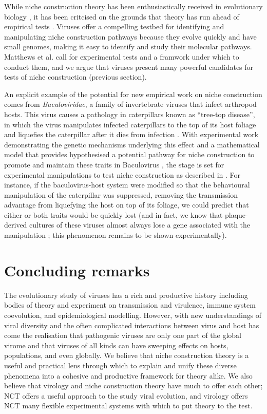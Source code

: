 \documentclass[review,draft,12pt]{elsarticle}
\begin{document}
While niche construction theory has been enthusiastically received in
evolutionary biology \citep{Laland:2010gb, Odling-Smee:2013zr}, it has
been critcised on the grounds that theory has run ahead of empirical
tests \citep{Scott-Phillips2014}. Viruses offer a compelling testbed for
identifying and manipulating niche construction pathways because they
evolve quickly and have small genomes, making it easy to identify and
study their molecular pathways. Matthews et al. \citep{Matthews2014}
call for experimental tests and a framwork under which to conduct them,
and we argue that viruses present many powerful candidates for tests of
niche construction (previous section).

An explicit example of the potential for new empirical work on niche
construction comes from \emph{Baculoviridae}, a family of invertebrate
viruses that infect arthropod hosts. This virus causes a pathology in
caterpillars known as ``tree-top disease'', in which the virus
manipulates infected caterpillars to the top of its host foliage and
liquefies the caterpillar after it dies from infection
\citep{Hoover:2011ly}. With experimental work demonstrating the genetic
mechanisms underlying this effect
\citep[e.g.][]{Hoover:2011ly, Hawtin:1997uq} and a mathematical model
that provides hypothesised a potential pathway for niche construction to
promote and maintain these traits in Baculovirus \citep{Hamblin:2013fk},
the stage is set for experimental manipulations to test niche
construction as described in \citep{Matthews2014}. For instance, if the
baculovirus-host system were modified so that the behavioural
manipulation of the caterpillar was suppressed, removing the
transmission advantage from liquefying the host on top of its foliage,
we could predict that either or both traits would be quickly lost (and
in fact, we know that plaque-derived cultures of these viruses almost
always lose a gene associated with the manipulation
\citep{Erlandson:2009ve}; this phenomenon remains to be shown
experimentally).

\section{Concluding remarks}\label{concluding-remarks}

The evolutionary study of viruses has a rich and productive history
including bodies of theory and experiment on transmission and virulence,
immune system coevolution, and epidemiological modelling. However, with
new understandings of viral diversity and the often complicated
interactions between virus and host has come the realisation that
pathogenic viruses are only one part of the global virome and that
viruses of all kinds can have sweeping effects on hosts, populations,
and even globally. We believe that niche construction theory is a useful
and practical lens through which to explain and unify these diverse
phenomena into a cohesive and productive framework for theory alike. We
also believe that virology and niche construction theory have much to
offer each other; NCT offers a useful approach to the study viral
evolution, and virology offers NCT many flexible experimental systems
with which to put theory to the test.
\end{document}
